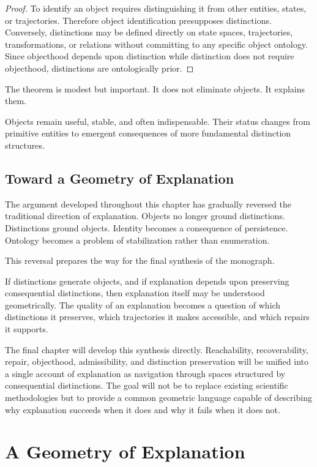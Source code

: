 \documentclass[11pt,oneside,openany]{book}
\begin{document}
\begin{proof}

To identify an object requires distinguishing it from other entities, states, or trajectories. Therefore object identification presupposes distinctions. Conversely, distinctions may be defined directly on state spaces, trajectories, transformations, or relations without committing to any specific object ontology. Since objecthood depends upon distinction while distinction does not require objecthood, distinctions are ontologically prior.

\end{proof}

The theorem is modest but important. It does not eliminate objects. It explains them.

Objects remain useful, stable, and often indispensable. Their status changes from primitive entities to emergent consequences of more fundamental distinction structures.

\section{Toward a Geometry of Explanation}

The argument developed throughout this chapter has gradually reversed the traditional direction of explanation. Objects no longer ground distinctions. Distinctions ground objects. Identity becomes a consequence of persistence. Ontology becomes a problem of stabilization rather than enumeration.

This reversal prepares the way for the final synthesis of the monograph.

If distinctions generate objects, and if explanation depends upon preserving consequential distinctions, then explanation itself may be understood geometrically. The quality of an explanation becomes a question of which distinctions it preserves, which trajectories it makes accessible, and which repairs it supports.

The final chapter will develop this synthesis directly. Reachability, recoverability, repair, objecthood, admissibility, and distinction preservation will be unified into a single account of explanation as navigation through spaces structured by consequential distinctions. The goal will not be to replace existing scientific methodologies but to provide a common geometric language capable of describing why explanation succeeds when it does and why it fails when it does not.

\chapter{A Geometry of Explanation}
\end{document}

